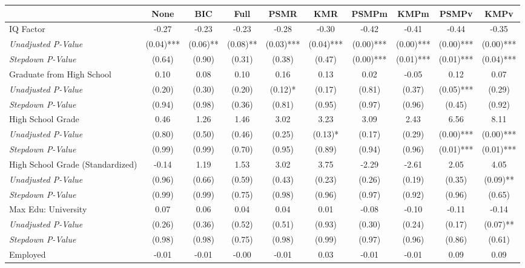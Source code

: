 \begin{tabular}{l c c c c c c c c c}
\toprule
 & None & BIC & Full & PSMR & KMR & PSMPm & KMPm & PSMPv & KMPv \\
\midrule
IQ Factor & -0.27 & -0.23 & -0.23 & -0.28 & -0.30 & -0.42 & -0.41 & -0.44 & -0.35 \\
\quad \textit{Unadjusted P-Value} & (0.04)*** & (0.06)** & (0.08)** & (0.03)*** & (0.04)*** & (0.00)*** & (0.00)*** & (0.00)*** & (0.00)*** \\
\quad \textit{Stepdown P-Value} & (0.64) & (0.90) & (0.31) & (0.38) & (0.47) & (0.00)*** & (0.01)*** & (0.01)*** & (0.04)*** \\
Graduate from High School & 0.10 & 0.08 & 0.10 & 0.16 & 0.13 & 0.02 & -0.05 & 0.12 & 0.07 \\
\quad \textit{Unadjusted P-Value} & (0.20) & (0.30) & (0.20) & (0.12)* & (0.17) & (0.81) & (0.37) & (0.05)*** & (0.29) \\
\quad \textit{Stepdown P-Value} & (0.94) & (0.98) & (0.36) & (0.81) & (0.95) & (0.97) & (0.96) & (0.45) & (0.92) \\
High School Grade & 0.46 & 1.26 & 1.46 & 3.02 & 3.23 & 3.09 & 2.43 & 6.56 & 8.11 \\
\quad \textit{Unadjusted P-Value} & (0.80) & (0.50) & (0.46) & (0.25) & (0.13)* & (0.17) & (0.29) & (0.00)*** & (0.00)*** \\
\quad \textit{Stepdown P-Value} & (0.99) & (0.99) & (0.70) & (0.95) & (0.89) & (0.94) & (0.96) & (0.01)*** & (0.01)*** \\
High School Grade (Standardized) & -0.14 & 1.19 & 1.53 & 3.02 & 3.75 & -2.29 & -2.61 & 2.05 & 4.05 \\
\quad \textit{Unadjusted P-Value} & (0.96) & (0.66) & (0.59) & (0.43) & (0.23) & (0.26) & (0.19) & (0.35) & (0.09)** \\
\quad \textit{Stepdown P-Value} & (0.99) & (0.99) & (0.75) & (0.98) & (0.96) & (0.97) & (0.92) & (0.96) & (0.65) \\
Max Edu: University & 0.07 & 0.06 & 0.04 & 0.04 & 0.01 & -0.08 & -0.10 & -0.11 & -0.14 \\
\quad \textit{Unadjusted P-Value} & (0.26) & (0.36) & (0.52) & (0.51) & (0.93) & (0.30) & (0.24) & (0.17) & (0.07)** \\
\quad \textit{Stepdown P-Value} & (0.98) & (0.98) & (0.75) & (0.98) & (0.99) & (0.97) & (0.96) & (0.86) & (0.61) \\
Employed & -0.01 & -0.01 & -0.00 & -0.01 & 0.03 & -0.01 & -0.01 & 0.09 & 0.09 \\

\end{tabular}

